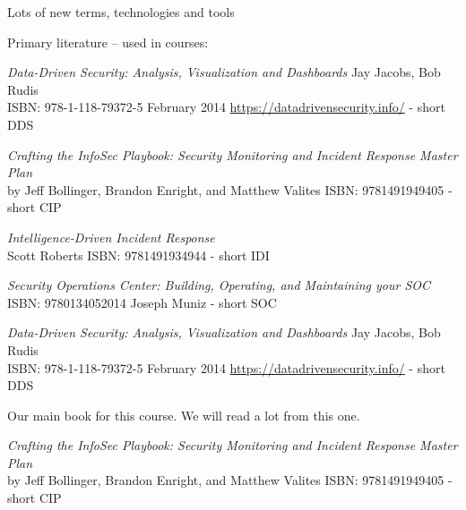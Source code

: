 \documentclass[Screen16to9,17pt]{foils}
\begin{document}
\begin{list2}
\item Lots of new terms, technologies and tools
\end{list2}



Primary literature -- used in courses:
\begin{list2}
\item \emph{Data-Driven Security: Analysis, Visualization and Dashboards} Jay Jacobs, Bob Rudis\\
ISBN: 978-1-118-79372-5 February 2014 \url{https://datadrivensecurity.info/} - short DDS
\item \emph{Crafting the InfoSec Playbook: Security Monitoring and Incident Response Master Plan}\\
 by Jeff Bollinger, Brandon Enright, and Matthew Valites ISBN: 9781491949405 - short CIP
\item \emph{Intelligence-Driven Incident Response} \\
 Scott Roberts ISBN: 9781491934944 - short IDI
\item \emph{Security Operations Center: Building, Operating, and Maintaining your SOC}\\
ISBN: 9780134052014 Joseph Muniz - short SOC
\end{list2}



\emph{Data-Driven Security: Analysis, Visualization and Dashboards} Jay Jacobs, Bob Rudis\\
ISBN: 978-1-118-79372-5 February 2014 \url{https://datadrivensecurity.info/} - short DDS

Our main book for this course. We will read a lot from this one.



\emph{Crafting the InfoSec Playbook: Security Monitoring and Incident Response Master Plan}\\
 by Jeff Bollinger, Brandon Enright, and Matthew Valites ISBN: 9781491949405 - short CIP



\end{document}
